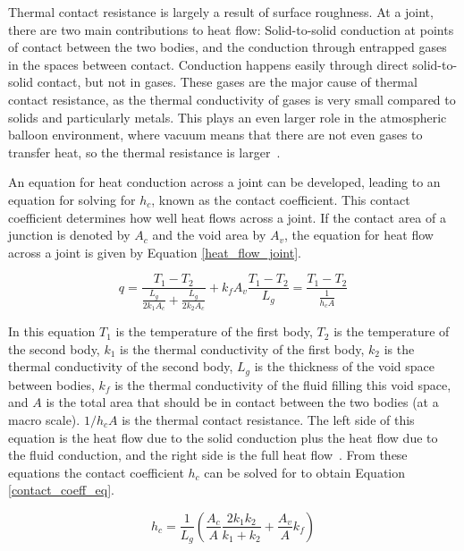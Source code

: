 Thermal contact resistance is largely a result of surface roughness. At a joint, there are two main contributions to heat flow: Solid-to-solid conduction at points of contact between the two bodies, and the conduction through entrapped gases in the spaces between contact. Conduction happens easily through direct solid-to-solid contact, but not in gases. These gases are the major cause of thermal contact resistance, as the thermal conductivity of gases is very small compared to solids and particularly metals. This plays an even larger role in the atmospheric balloon environment, where vacuum means that there are not even gases to transfer heat, so the thermal resistance is larger~\citep{Heat_Transfer_Resistance}. 

An equation for heat conduction across a joint can be developed, leading to an equation for solving for $h_c$, known as the contact coefficient. This contact coefficient determines how well heat flows across a joint. If the contact area of a junction is denoted by $A_c$ and the void area by $A_v$, the equation for heat flow across a joint is given by Equation \ref{heat_flow_joint}. %

\begin{equation}\label{heat_flow_joint}
    q = \frac{T_1 - T_2}{\frac{L_g}{2k_1A_c}+\frac{L_g}{2k_2A_c}}+k_fA_v\frac{T_1-T_2}{L_g} = \frac{T_1-T_2}{\frac{1}{h_cA}}
\end{equation}

In this equation $T_1$ is the temperature of the first body, $T_2$ is the temperature of the second body, $k_1$ is the thermal conductivity of the first body, $k_2$ is the thermal conductivity of the second body, $L_g$ is the thickness of the void space between bodies, $k_f$ is the thermal conductivity of the fluid filling this void space, and $A$ is the total area that should be in contact between the two bodies (at a macro scale). $1/h_cA$ is the thermal contact resistance. The left side of this equation is the heat flow due to the solid conduction plus the heat flow due to the fluid conduction, and the right side is the full heat flow~\citep{Heat_Transfer_Resistance}. From these equations the contact coefficient $h_c$ can be solved for to obtain Equation \ref{contact_coeff_eq}.

\begin{equation}\label{contact_coeff_eq}
    h_c = \frac{1}{L_g}\left( \frac{A_c}{A}\frac{2k_1k_2}{k_1+k_2}+\frac{A_v}{A}k_f \right)
\end{equation}


